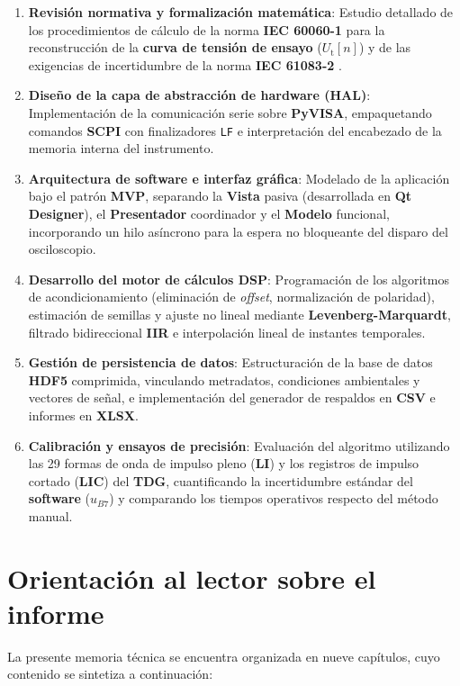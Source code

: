 \begin{enumerate}
    \item \textbf{Revisión normativa y formalización matemática}: Estudio detallado de los procedimientos de cálculo de la norma \textbf{IEC 60060-1} \cite{iec60060_1} para la reconstrucción de la \textbf{curva de tensión de ensayo} ($U_\text{t}[n]$) y de las exigencias de incertidumbre de la norma \textbf{IEC 61083-2} \cite{iec61083_2}.
    \item \textbf{Diseño de la capa de abstracción de hardware (HAL)}: Implementación de la comunicación serie sobre \textbf{PyVISA}, empaquetando comandos \textbf{SCPI} con finalizadores \texttt{LF} e interpretación del encabezado de la memoria interna del instrumento.
    \item \textbf{Arquitectura de software e interfaz gráfica}: Modelado de la aplicación bajo el patrón \textbf{MVP}, separando la \textbf{Vista} pasiva (desarrollada en \textbf{Qt Designer}), el \textbf{Presentador} coordinador y el \textbf{Modelo} funcional, incorporando un hilo asíncrono para la espera no bloqueante del disparo del osciloscopio.
    \item \textbf{Desarrollo del motor de cálculos DSP}: Programación de los algoritmos de acondicionamiento (eliminación de \emph{offset}, normalización de polaridad), estimación de semillas y ajuste no lineal mediante \textbf{Levenberg-Marquardt}, filtrado bidireccional \textbf{IIR} e interpolación lineal de instantes temporales.
    \item \textbf{Gestión de persistencia de datos}: Estructuración de la base de datos \textbf{HDF5} comprimida, vinculando metradatos, condiciones ambientales y vectores de señal, e implementación del generador de respaldos en \textbf{CSV} e informes en \textbf{XLSX}.
    \item \textbf{Calibración y ensayos de precisión}: Evaluación del algoritmo utilizando las \num{29} formas de onda de impulso pleno (\textbf{LI}) y los registros de impulso cortado (\textbf{LIC}) del \textbf{TDG}, cuantificando la incertidumbre estándar del \textbf{software} ($u_{B7}$) y comparando los tiempos operativos respecto del método manual.
\end{enumerate}

\section{Orientación al lector sobre el informe} \label{sec:orientacion_lector}

La presente memoria técnica se encuentra organizada en nueve capítulos, cuyo contenido se sintetiza a continuación:

